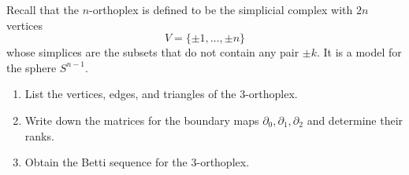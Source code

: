 \documentclass[12 pt, letterpaper]{hmcpset}
\begin{document}
\begin{problem}[59.]
	Recall that the $n$-orthoplex is defined to be the simplicial complex with $2n$ vertices
	\[
		V = \{ \pm 1, \dots, \pm n \}
	\]
	whose simplices are the subsets that do not contain any pair $\pm k$. It is a model for the sphere $S^{n - 1}$.

	\begin{enumerate}
		\item List the vertices, edges, and triangles of the $3$-orthoplex.

		\item Write down the matrices for the boundary maps $\partial_{0}, \partial_{1}, \partial_{2}$ and determine their ranks.

		\item Obtain the Betti sequence for the $3$-orthoplex.
	\end{enumerate}
\end{problem}
\end{document}
